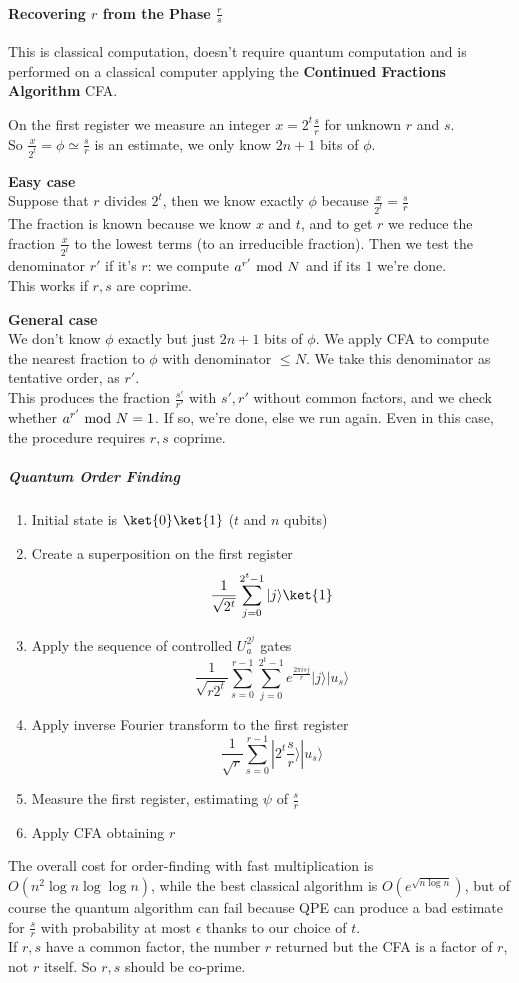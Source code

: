 \documentclass[10pt]{report}
\begin{document}
\paragraph{Recovering $r$ from the Phase $\frac{r}{s}$} This is classical computation, doesn't require quantum computation and is performed on a classical computer applying the \textbf{Continued Fractions Algorithm} CFA.\begin{list}{}{}
	\item On the first register we measure an integer $x=2^t\frac{s}{r}$ for unknown $r$ and $s$.\\
	So $\frac{x}{2^t}=\phi \simeq \frac{s}{r}$ is an estimate, we only know $2n+1$ bits of $\phi$.
	\item \textbf{Easy case}\\
	Suppose that $r$ divides $2^t$, then we know exactly $\phi$ because $\frac{x}{2^t}=\frac{s}{r}$\\
	The fraction is known because we know $x$ and $t$, and to get $r$ we reduce the fraction $\frac{x}{2^t}$ to the lowest terms (to an irreducible fraction). Then we test the denominator $r'$ if it's $r$: we compute $a^{r'}\hbox{ mod }N$ and if its $1$ we're done.\\
	This works if $r,s$ are coprime.
	\item \textbf{General case}\\
	We don't know $\phi$ exactly but just $2n+1$ bits of $\phi$. We apply CFA to compute the nearest fraction to $\phi$ with denominator $\leq N$. We take this denominator as tentative order, as $r'$.\\
	This produces the fraction $\frac{s'}{r'}$ with $s',r'$ without common factors, and we check whether $a^{r'}\hbox{ mod }N =1$. If so, we're done, else we run again. Even in this case, the procedure requires $r,s$ coprime.
\end{list}
\subparagraph{Quantum Order Finding}
\begin{enumerate}
	\item Initial state is $\ket{0}\ket{1}$ ($t$ and $n$ qubits)
	\item Create a superposition on the first register $$\frac{1}{\sqrt{2^t}}\sum_{j=0}^{2^t-1}|j\rangle\ket{1}$$
	\item Apply the sequence of controlled $U_a^{2^j}$ gates
	 $$\frac{1}{\sqrt{r2^t}}\sum_{s=0}^{r-1}\sum_{j=0}^{2^t-1}e^{\frac{2\pi isj}{r}}|j\rangle|u_s\rangle$$
	 \item Apply inverse Fourier transform to the first register
	 $$\frac{1}{\sqrt{r}}\sum_{s=0}^{r-1}|2^t\frac{s}{r}\rangle|u_s\rangle$$
	 \item Measure the first register, estimating $\psi$ of $\frac{s}{r}$
	 \item Apply CFA obtaining $r$
\end{enumerate}
The overall cost for order-finding with fast multiplication is $O(n^2\log n\log\log n)$, while the best classical algorithm is $O(e^{\sqrt{n\log n}})$, but of course the quantum algorithm can fail because QPE can produce a bad estimate for $\frac{s}{r}$ with probability at most $\epsilon$ thanks to our choice of $t$.\\
If $r,s$ have a common factor, the number $r$ returned but the CFA is a factor of $r$, not $r$ itself. So $r,s$ should be co-prime.
\end{document}
